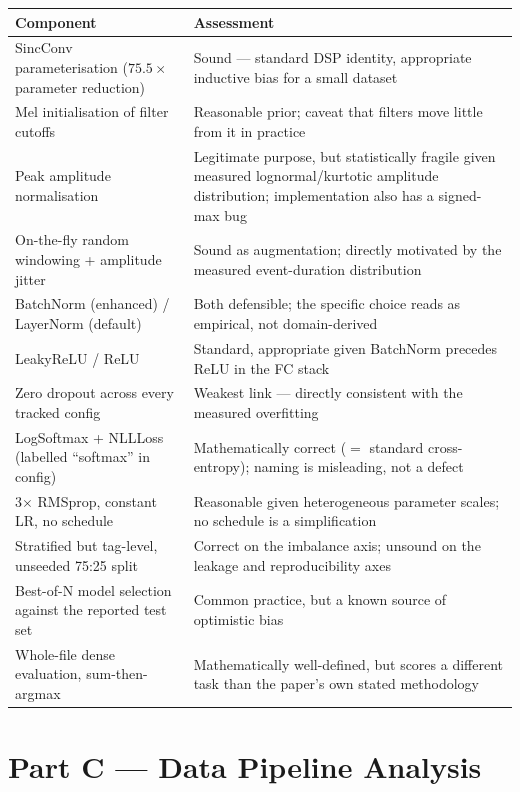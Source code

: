\documentclass[11pt]{article}
\begin{document}
\begin{table}[h]
\centering
\small
\begin{tabularx}{\textwidth}{Y Y}
\toprule
Component & Assessment \\
\midrule
SincConv parameterisation ($75.5\times$ parameter reduction) & Sound --- standard DSP identity, appropriate inductive bias for a small dataset \\
Mel initialisation of filter cutoffs & Reasonable prior; caveat that filters move little from it in practice \\
Peak amplitude normalisation & Legitimate purpose, but statistically fragile given measured lognormal/kurtotic amplitude distribution; implementation also has a signed-max bug \\
On-the-fly random windowing + amplitude jitter & Sound as augmentation; directly motivated by the measured event-duration distribution \\
BatchNorm (enhanced) / LayerNorm (default) & Both defensible; the specific choice reads as empirical, not domain-derived \\
LeakyReLU / ReLU & Standard, appropriate given BatchNorm precedes ReLU in the FC stack \\
Zero dropout across every tracked config & Weakest link --- directly consistent with the measured overfitting \\
LogSoftmax + NLLLoss (labelled ``softmax'' in config) & Mathematically correct ($=$ standard cross-entropy); naming is misleading, not a defect \\
3$\times$ RMSprop, constant LR, no schedule & Reasonable given heterogeneous parameter scales; no schedule is a simplification \\
Stratified but tag-level, unseeded 75:25 split & Correct on the imbalance axis; unsound on the leakage and reproducibility axes \\
Best-of-N model selection against the reported test set & Common practice, but a known source of optimistic bias \\
Whole-file dense evaluation, sum-then-argmax & Mathematically well-defined, but scores a different task than the paper's own stated methodology \\
\bottomrule
\end{tabularx}
\end{table}

\section{Part C --- Data Pipeline Analysis}
\end{document}

